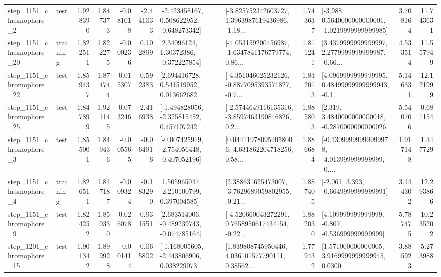 \begin{tabular}{llrrrrllrlrr}
  step\_1151\_chromophore\_2 &      test &      1.928390 &    1.847373 &     -0.081018 & -2.441033 &   [-2.423458167, 0.508622952, -0.648273342] &  [-3.825752342603727, 1.3963987619436986, -1.18... &       1.743637 &  [-3.988, 0.5640000000000001, -1.0219999999999985] &            3.708164 &         11.743631 \\
 step\_1151\_chromophore\_20 &  training &      1.822511 &    1.822275 &     -0.000236 &  0.102899 &      [2.34096124, 1.30372386, -0.372227854] &  [-4.053159200456987, -1.6347841176779774, 0.86... &       1.811241 &  [3.4379999999999997, 2.2779999999999987, -0.66... &            4.533514 &         11.557949 \\
 step\_1151\_chromophore\_22 &      test &      1.859437 &    1.874744 &      0.015307 &  0.592383 &     [2.694416728, 0.541519952, 0.013662682] &  [-4.351046025232126, -0.8877095393571827, -0.7... &       1.832013 &  [4.0969999999999995, 0.48499999999999943, -0.1... &            5.146331 &         12.121999 \\
 step\_1151\_chromophore\_25 &      test &      1.847899 &    1.921145 &      0.073246 &  2.416938 &   [-1.494828056, -2.325815452, 0.457107242] &  [-2.5744649116135316, -3.8597463190846826, 0.2... &       1.885803 &   [2.319, 3.4840000000000018, -0.2870000000000026] &            5.540706 &          0.681154 \\
  step\_1151\_chromophore\_3 &      test &      1.855001 &    1.849436 &     -0.005565 & -0.064916 &  [-0.007425919, -2.754056448, -0.407052196] &  [0.044119780952058006, 4.631862204718256, 0.58... &       1.886684 &  [-0.13099999999999978, -4.013999999999999, -0.... &            1.917148 &          1.347729 \\
  step\_1151\_chromophore\_4 &  training &      1.826511 &    1.817187 &     -0.009324 & -0.183290 &    [1.505965047, -2.210100799, 0.397004585] &  [2.388631625473007, -3.7629689059802955, -0.21... &       1.887405 &               [-2.061, 3.393, -0.6649999999999991] &            3.144302 &         12.293866 \\
  step\_1151\_chromophore\_9 &      test &      1.824252 &    1.850330 &      0.026078 &  0.931551 &   [2.683514006, -0.489239743, -0.074785164] &  [-4.520660043272291, 0.7658950617434154, -0.22... &       1.882030 &    [4.109999999999999, -0.807, -0.536999999999999] &            5.787475 &         10.235202 \\
 step\_1201\_chromophore\_15 &      test &      1.901342 &    1.899928 &     -0.001414 &  0.065802 &   [-1.168005605, -2.443806906, 0.038229073] &  [1.839808745950446, 4.036101577790111, 0.38562... &       1.779432 &  [1.571000000000005, 3.9169999999999945, 0.0300... &            3.885923 &          5.273988 \\

\end{tabular}
